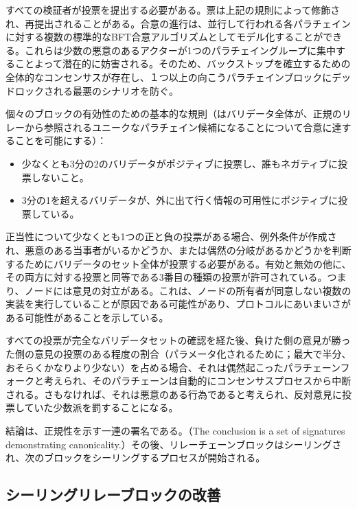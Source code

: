 すべての検証者が投票を提出する必要がある。票は上記の規則によって修飾され、再提出されることがある。合意の進行は、並行して行われる各パラチェインに対する複数の標準的なBFT合意アルゴリズムとしてモデル化することができる。これらは少数の悪意のあるアクターが1つのパラチェイングループに集中することよって潜在的に妨害される。そのため、バックストップを確立するための全体的なコンセンサスが存在し、１つ以上の向こうパラチェインブロックにデッドロックされる最悪のシナリオを防ぐ。

個々のブロックの有効性のための基本的な規則（はバリデータ全体が、正規のリレーから参照されるユニークなパラチェイン候補になることについて合意に達することを可能にする）：

\begin{itemize}
\tightlist
\item
  少なくとも3分の2のバリデータがポジティブに投票し、誰もネガティブに投票しないこと。
\item
  3分の1を超えるバリデータが、外に出て行く情報の可用性にポジティブに投票している。
\end{itemize}

正当性について少なくとも1つの正と負の投票がある場合、例外条件が作成され、悪意のある当事者がいるかどうか、または偶然の分岐があるかどうかを判断するためにバリデータのセット全体が投票する必要がある。有効と無効の他に、その両方に対する投票と同等である3番目の種類の投票が許可されている。つまり、ノードには意見の対立がある。これは、ノードの所有者が同意しない複数の実装を実行していることが原因である可能性があり、プロトコルにあいまいさがある可能性があることを示している。

すべての投票が完全なバリデータセットの確認を経た後、負けた側の意見が勝った側の意見の投票のある程度の割合（パラメータ化されるために；最大で半分、おそらくかなりより少ない）を占める場合、それは偶然起こったパラチェーンフォークと考えられ、そのパラチェーンは自動的にコンセンサスプロセスから中断される。さもなければ、それは悪意のある行為であると考えられ、反対意見に投票していた少数派を罰することになる。

結論は、正規性を示す一連の署名である。（The conclusion is a set of
signatures demonstrating
canonicality.）その後、リレーチェーンブロックはシーリングされ、次のブロックをシーリングするプロセスが開始される。

\hypertarget{ux30b7ux30fcux30eaux30f3ux30b0ux30eaux30ecux30fcux30d6ux30edux30c3ux30afux306eux6539ux5584}{%
\subsection{シーリングリレーブロックの改善}\label{ux30b7ux30fcux30eaux30f3ux30b0ux30eaux30ecux30fcux30d6ux30edux30c3ux30afux306eux6539ux5584}}

